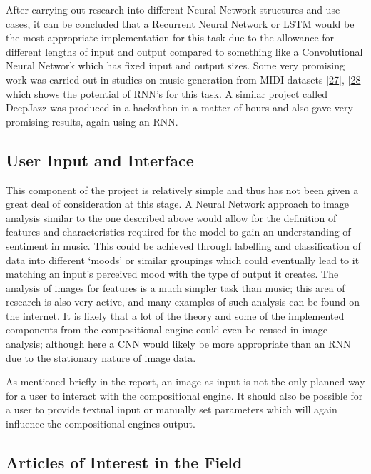 \documentclass[12pt,]{article}
\begin{document}
After carrying out research into different Neural Network structures and
use-cases, it can be concluded that a Recurrent Neural Network or LSTM
would be the most appropriate implementation for this task due to the
allowance for different lengths of input and output compared to
something like a Convolutional Neural Network which has fixed input and
output sizes. Some very promising work was carried out in studies on
music generation from MIDI datasets
{[}\protect\hyperlink{ref-hilschermusic}{27}{]},
{[}\protect\hyperlink{ref-wyse2018real}{28}{]} which shows the potential
of RNN's for this task. A similar project called DeepJazz was produced
in a hackathon in a matter of hours and also gave very promising
results, again using an RNN.

\hypertarget{user-input-and-interface}{%
\subsection{User Input and Interface}\label{user-input-and-interface}}

This component of the project is relatively simple and thus has not been
given a great deal of consideration at this stage. A Neural Network
approach to image analysis similar to the one described above would
allow for the definition of features and characteristics required for
the model to gain an understanding of sentiment in music. This could be
achieved through labelling and classification of data into different
`moods' or similar groupings which could eventually lead to it matching
an input's perceived mood with the type of output it creates. The
analysis of images for features is a much simpler task than music; this
area of research is also very active, and many examples of such analysis
can be found on the internet. It is likely that a lot of the theory and
some of the implemented components from the compositional engine could
even be reused in image analysis; although here a CNN would likely be
more appropriate than an RNN due to the stationary nature of image data.

As mentioned briefly in the report, an image as input is not the only
planned way for a user to interact with the compositional engine. It
should also be possible for a user to provide textual input or manually
set parameters which will again influence the compositional engines
output.

\hypertarget{articles-of-interest-in-the-field}{%
\subsection{Articles of Interest in the
Field}\label{articles-of-interest-in-the-field}}
\end{document}
